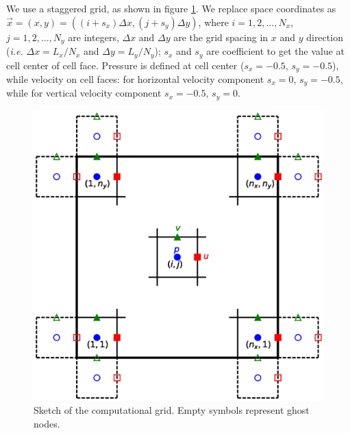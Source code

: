 \documentclass[a4paper,11pt]{report}
\begin{document}
We use a staggered grid, as shown in figure \ref{fig:grid}. We replace space coordinates as $\vec{x} = (x,y) = ((i + s_x)\Delta x,(j + s_y)\Delta y)$, where $i = 1,2,\dots,N_x$, $j = 1,2,\dots,N_y$ are integers, $\Delta x$ and $\Delta y$ are the grid spacing in $x$ and $y$ direction (\emph{i.e.} $\Delta x = L_x/N_x$ and $\Delta y = L_y/N_y$); $s_x$ and $s_y$ are coefficient to get the value at cell center of cell face. Pressure is defined at cell center ($s_x = -0.5$, $s_y = -0.5$), while velocity on cell faces: for horizontal velocity component $s_x = 0$, $s_y = -0.5$, while for vertical velocity component $s_x = -0.5$, $s_y = 0$.

\begin{figure}[ht]
    \includegraphics[width=\textwidth]{grid.eps}
    \caption{Sketch of the computational grid. Empty symbols represent ghost nodes.\label{fig:grid}}
\end{figure}
\end{document}
